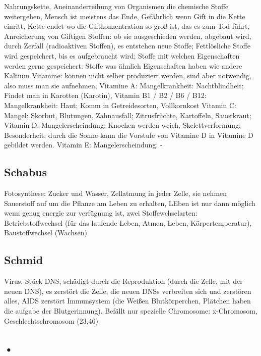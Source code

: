 \documentclass[a4paper]{article}
\begin{document}
Nahrungskette, Aneinanderreihung von Organismen die chemische Stoffe weitergehen, Mensch ist meistens das Ende, Gefährlich wenn Gift in die Kette einritt, Kette endet wo die Giftkonzentration so groß ist, das es zum Tod führt, Anreicherung von Giftigen Stoffen: ob sie ausgeschieden werden, abgebaut wird, durch Zerfall (radioaktiven Stoffen), es entstehen neue Stoffe; Fettlösliche Stoffe wird gespeichert, bis es aufgebraucht wird; Stoffe mit welchen Eigenschaften werden gerne gespeichert: Stoffe was ähnlich Eigenschaften haben wie andere Kaltium
Vitamine: können nicht selber produziert werden, sind aber notwendig, also muss man sie aufnehmen; Vitamine A: Mangelkrankheit: Nachtblindheit; Findet man in Karotten (Karotin), Vitamin B1 / B2 / B6 / B12: Mangelkrankheit: Haut; Komm in Getreidesorten,  Vollkornkost
Vitamin C: Mangel: Skorbut, Blutungen, Zahnausfall; Zitrusfrüchte, Kartoffeln, Sauerkraut; Vitamin D: Mangelerscheindung: Knochen werden weich, Skelettverformung; Besonderheit: durch die Sonne kann die Vorstufe von Vitamine D in Vitamine D gebildet werden. Vitamin E: Mangelerscheindung: -

\subsection{Schabus}

Fotosynthese: Zucker und Wasser, Zellatmung in jeder Zelle, sie nehmen Sauerstoff auf um die Pflanze am Leben zu erhalten, LEben ist nur dann möglich wenn genug energie zur verfügnung ist, zwei Stoffewchselarten: Betriebstoffwechsel (für das laufende Leben, Atmen, Leben, Körpertemperatur), Baustoffwechsel (Wachsen)

\subsection{Schmid}

Virus: Stück DNS, schädigt durch die Reproduktion (durch die Zelle, mit der neuen DNS), es zerstört die Zelle, die neuen DNSs verbreiten sich und zerstören alles, AIDS zerstört Immunsystem (die Weißen Blutkörperchen, Plätchen haben die aufgabe der Blutgerinnung). Befällt nur spezielle Chromosome: x-Chromosom, Geschlechtschromosom (23,46)

\subsection{•}
\end{document}
